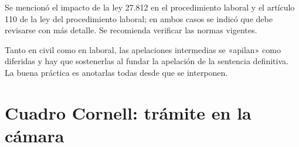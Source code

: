 \documentclass[12pt,oneside]{book}
\begin{document}
\begin{note}
Se mencionó el impacto de la ley 27.812 en el procedimiento laboral y el artículo 110 de la ley del procedimiento laboral; en ambos casos se indicó que debe revisarse con más detalle. Se recomienda verificar las normas vigentes.
\end{note}

\begin{important}
Tanto en civil como en laboral, las apelaciones intermedias se «apilan» como diferidas y hay que sostenerlas al fundar la apelación de la sentencia definitiva. La buena práctica es anotarlas todas desde que se interponen.
\end{important}

\section*{Cuadro Cornell: trámite en la cámara}
\end{document}
